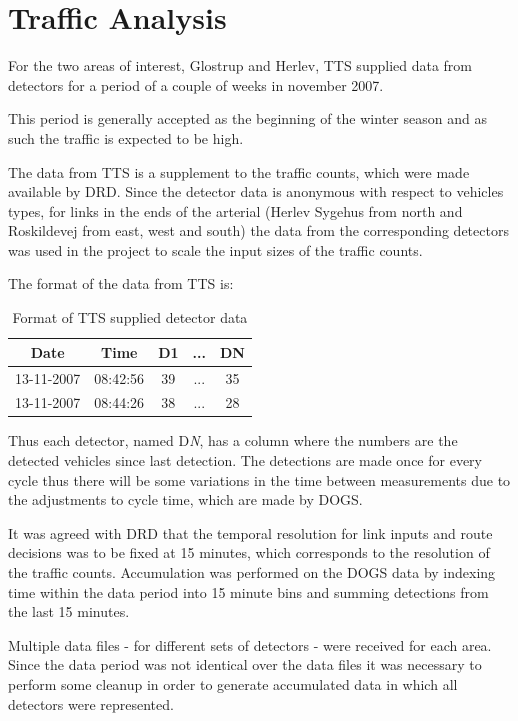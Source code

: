 \section{Traffic Analysis}
\label{data}
For the two areas of interest, Glostrup and Herlev, TTS supplied data from detectors for a period of a couple of weeks in november 2007. 

This period is generally accepted as the beginning of the winter season and as such the traffic is expected to be high.

The data from TTS is a supplement to the traffic counts, which were made available by DRD. Since the detector data is anonymous with respect to vehicles types, for links in the ends of the arterial (Herlev Sygehus from north and Roskildevej from east, west and south) the data from the corresponding detectors was used in the project to scale the input sizes of the traffic counts.

The format of the data from TTS is:

\begin{table}[ht]
\centering
\begin{tabular}{c|c|c|c|c}
\textbf{Date} & \textbf{Time} & \textbf{D1} & \textbf{...} & \textbf{DN} \\ \hline
13-11-2007 & 08:42:56 & 39 & ... & 35 \\
13-11-2007 & 08:44:26 & 38 & ...  & 28 \\
\end{tabular}
\caption{Format of TTS supplied detector data}
\label{tab:dataformat}
\end{table}

Thus each detector, named D\textit{N}, has a column where the numbers are the detected vehicles since last detection. The detections are made once for every cycle thus there will be some variations in the time between measurements due to the adjustments to cycle time, which are made by DOGS.

It was agreed with DRD that the temporal resolution for link inputs and route decisions was to be fixed at 15 minutes, which corresponds to the resolution of the traffic counts. Accumulation was performed on the DOGS data by indexing time within the data period into 15 minute bins and summing detections from the last 15 minutes.

Multiple data files - for different sets of detectors - were received for each area. Since the data period was not identical over the data files it was necessary to perform some cleanup in order to generate accumulated data in which all detectors were represented.

